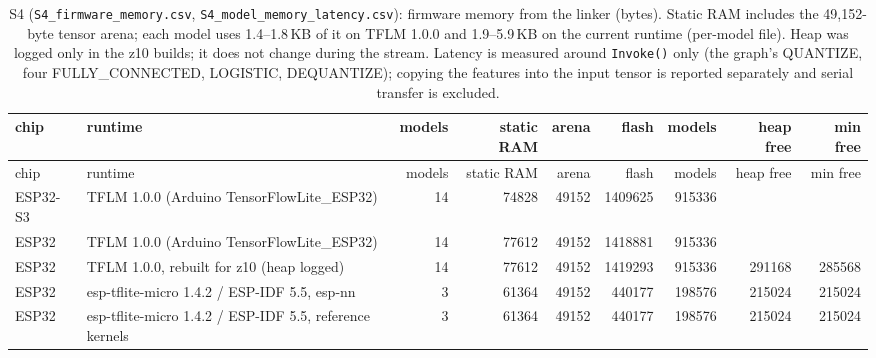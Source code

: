 \documentclass[10pt]{article}
\begin{document}
{\scriptsize
\begin{longtable}{llrrrrrrr}
\caption{S4 (\texttt{S4\_firmware\_memory.csv}, \texttt{S4\_model\_memory\_latency.csv}): firmware memory from the linker (bytes). Static RAM includes the 49,152-byte tensor arena; each model uses 1.4--1.8\,KB of it on TFLM 1.0.0 and 1.9--5.9\,KB on the current runtime (per-model file). Heap was logged only in the z10 builds; it does not change during the stream. Latency is measured around \texttt{Invoke()} only (the graph's QUANTIZE, four FULLY\_CONNECTED, LOGISTIC, DEQUANTIZE); copying the features into the input tensor is reported separately and serial transfer is excluded.}\\
\toprule
chip & runtime & models & static RAM & arena & flash & models & heap free & min free \\
\midrule
\endfirsthead
\toprule
chip & runtime & models & static RAM & arena & flash & models & heap free & min free \\
\midrule
\endhead
\bottomrule
\endlastfoot
ESP32-S3 & TFLM 1.0.0 (Arduino TensorFlowLite\_ESP32) & 14 & 74828 & 49152 & 1409625 & 915336 &  &  \\
ESP32 & TFLM 1.0.0 (Arduino TensorFlowLite\_ESP32) & 14 & 77612 & 49152 & 1418881 & 915336 &  &  \\
ESP32 & TFLM 1.0.0, rebuilt for z10 (heap logged) & 14 & 77612 & 49152 & 1419293 & 915336 & 291168 & 285568 \\
ESP32 & esp-tflite-micro 1.4.2 / ESP-IDF 5.5, esp-nn & 3 & 61364 & 49152 & 440177 & 198576 & 215024 & 215024 \\
ESP32 & esp-tflite-micro 1.4.2 / ESP-IDF 5.5, reference kernels & 3 & 61364 & 49152 & 440177 & 198576 & 215024 & 215024 \\
\end{longtable}}
\end{document}
